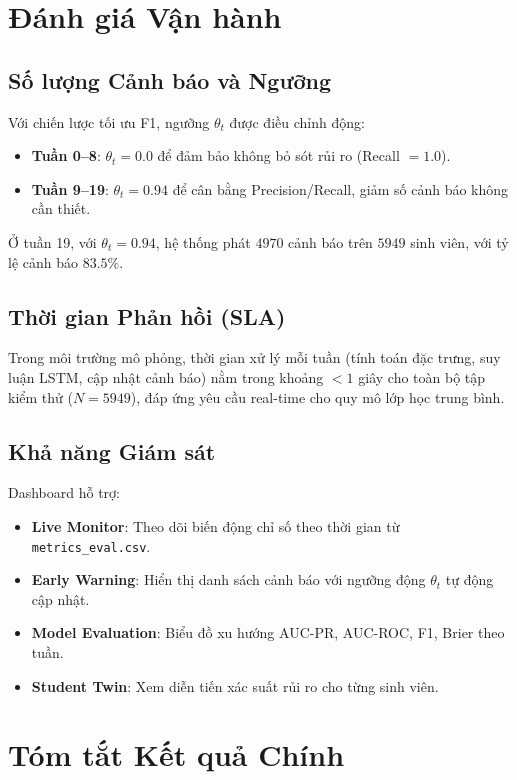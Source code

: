 \documentclass[12pt,a4paper]{article}
\begin{document}
\section{Đánh giá Vận hành}

\subsection{Số lượng Cảnh báo và Ngưỡng}

Với chiến lược tối ưu F1, ngưỡng $\theta_t$ được điều chỉnh động:
\begin{itemize}
    \item \textbf{Tuần 0--8}: $\theta_t = 0.0$ để đảm bảo không bỏ sót rủi ro (Recall $= 1.0$).
    \item \textbf{Tuần 9--19}: $\theta_t = 0.94$ để cân bằng Precision/Recall, giảm số cảnh báo không cần thiết.
\end{itemize}

Ở tuần 19, với $\theta_t = 0.94$, hệ thống phát $4970$ cảnh báo trên $5949$ sinh viên, với tỷ lệ cảnh báo $83.5\%$.

\subsection{Thời gian Phản hồi (SLA)}

Trong môi trường mô phỏng, thời gian xử lý mỗi tuần (tính toán đặc trưng, suy luận LSTM, cập nhật cảnh báo) nằm trong khoảng $< 1$ giây cho toàn bộ tập kiểm thử ($N = 5949$), đáp ứng yêu cầu real-time cho quy mô lớp học trung bình.

\subsection{Khả năng Giám sát}

Dashboard hỗ trợ:
\begin{itemize}
    \item \textbf{Live Monitor}: Theo dõi biến động chỉ số theo thời gian từ \texttt{metrics\_eval.csv}.
    \item \textbf{Early Warning}: Hiển thị danh sách cảnh báo với ngưỡng động $\theta_t$ tự động cập nhật.
    \item \textbf{Model Evaluation}: Biểu đồ xu hướng AUC-PR, AUC-ROC, F1, Brier theo tuần.
    \item \textbf{Student Twin}: Xem diễn tiến xác suất rủi ro cho từng sinh viên.
\end{itemize}

\section{Tóm tắt Kết quả Chính}
\end{document}
